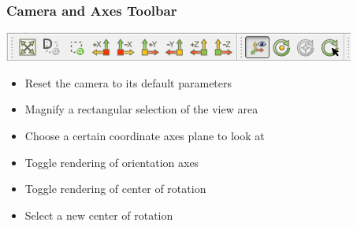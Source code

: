 \begin{frame}[fragile]
\begin{minipage}{0.45 \textwidth}
\begin{center}
      \end{center}
    \end{minipage}
\end{frame}

\begin{frame}
  \frametitle{Camera and Axes Toolbar}

  \includegraphics[width=\textwidth]{screenshots/camerabar.png}

    \begin{itemize}
      \item Reset the camera to its default parameters
      \item Magnify a rectangular selection of the view area
      \item Choose a certain coordinate axes plane to look at
      \item Toggle rendering of orientation axes 
      \item Toggle rendering of center of rotation 
      \item Select a new center of rotation 
    \end{itemize}
\end{frame}

